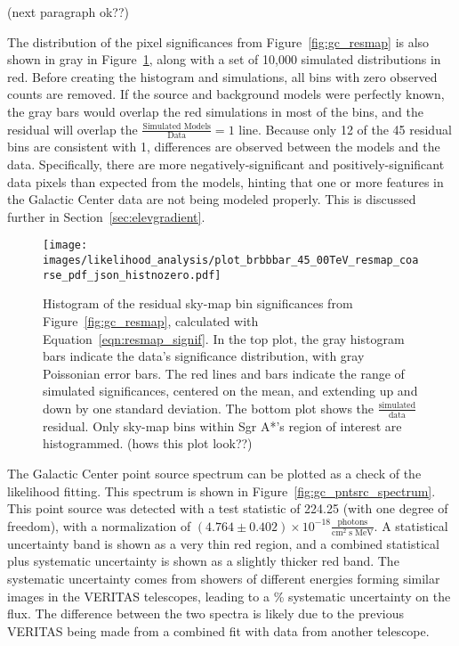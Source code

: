 {\color{red}(next paragraph ok??)}

The distribution of the pixel significances from Figure~\ref{fig:gc_resmap} is also shown in gray in Figure~\ref{fig:gc_resmap_sighist_coarse}, along with a set of 10,000 simulated distributions in red.
Before creating the histogram and simulations, all bins with zero observed counts are removed.
If the source and background models were perfectly known, the gray bars would overlap the red simulations in most of the bins, and the residual will overlap the ${\frac{\textrm{Simulated Models}}{\textrm{Data}}=1}$ line.
Because only 12 of the 45 residual bins are consistent with 1, differences are observed between the models and the data.
Specifically, there are more negatively-significant and positively-significant data pixels than expected from the models, hinting that one or more features in the Galactic Center data are not being modeled properly.
This is discussed further in Section~\ref{sec:elevgradient}.

\begin{figure}[ht]
  \centering
  \texttt{[image: images/likelihood\_analysis/plot\_brbbbar\_45\_00TeV\_resmap\_coarse\_pdf\_json\_histnozero.pdf]}
  \caption[Galactic Center Residual Histogram]
  {
    Histogram of the residual sky-map bin significances from Figure~\ref{fig:gc_resmap}, calculated with Equation~\ref{eqn:resmap_signif}.
    In the top plot, the gray histogram bars indicate the data’s significance distribution, with gray Poissonian error bars.
     The red lines and bars indicate the range of simulated significances, centered on the mean, and extending up and down by one standard deviation.
    The bottom plot shows the $\frac{\textrm{simulated}}{\textrm{data}}$ residual.
    Only sky-map bins within Sgr A*'s region of interest are histogrammed.
    {\color{red}(hows this plot look??)}
  }
  \label{fig:gc_resmap_sighist_coarse}
\end{figure}

The Galactic Center point source spectrum can be plotted as a check of the likelihood fitting.
This spectrum is shown in Figure~\ref{fig:gc_pntsrc_spectrum}.
This point source was detected with a test statistic of 224.25 (with one degree of freedom), with a normalization of $(4.764\pm0.402)\times 10^{-18} \frac{\textrm{photons}}{\textrm{cm}^2\;\textrm{s}\;\textrm{MeV}}$.
A statistical uncertainty band is shown as a very thin red region, and a combined statistical plus systematic uncertainty is shown as a slightly thicker red band.
The systematic uncertainty comes from showers of different energies forming similar images in the VERITAS telescopes, leading to a \% systematic uncertainty on the flux.
The difference between the two spectra is likely due to the previous VERITAS being made from a combined fit with data from another telescope.

